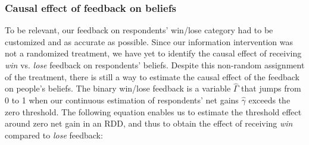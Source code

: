 \documentclass[12pt]{article} %
\begin{document}
\subsubsection{Causal effect of feedback on beliefs\label{subsec:causal_feedback}} 


To be relevant, our feedback on respondents' win/lose category had to be customized and as accurate as possible. Since our information intervention was not a randomized treatment, we have yet to identify the causal effect of receiving \textit{win} vs. \textit{lose} feedback on respondents' beliefs. Despite this non-random assignment of the treatment, there is still a way to estimate the causal effect of the feedback on people's beliefs. The binary win/lose feedback is a variable $\widehat{\Gamma}$ that jumps from 0 to 1 when our continuous estimation of respondents' net gains $\widehat{\gamma}$ exceeds the zero threshold. The following equation enables us to estimate the threshold effect around zero net gain in an RDD, and thus to obtain the effect of receiving \textit{win} compared to \textit{lose} feedback:
\end{document}
